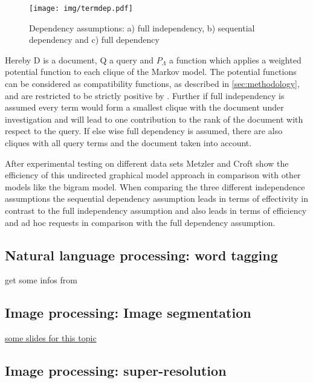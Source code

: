 \begin{figure}[htpb]
  \centering
  	\texttt{[image: img/termdep.pdf]}
  \caption{Dependency assumptions: a) full independency, b) sequential dependency and c) full dependency}
  \label{fig:termdep}
\end{figure}

Hereby D is a document, Q a query and $P_\Lambda$ a function which applies a weighted potential function to each clique of the Markov model. The potential functions can be considered as compatibility functions, as described in \ref{sec:methodology}, and are restricted to be strictly positive by \cite{metzler2005markov}. Further if full independency is assumed every term would form a smallest clique with the document under investigation and will lead to one contribution to the rank of the document with respect to the query. If else wise full dependency is assumed, there are also cliques with all query terms and the document taken into account.

After experimental testing on different data sets Metzler and Croft show the efficiency of this undirected graphical model approach in comparison with other models like the bigram model. When comparing the three different independence assumptions the sequential dependency assumption leads in terms of effectivity in contrast to the full independency assumption and also leads in terms of efficiency and ad hoc requests in comparison with the full dependency assumption.


\subsection{Natural language processing: word tagging}
\label{sec:tag}
get some infos from \cite{collobert2011natural}

\subsection{Image processing: Image segmentation}
\href{https://inf.u-szeged.hu/~ssip/2008/presentations2/Kato_ssip2008.pdf}{some slides for this topic}

\cite{kato2006markov}

\subsection{Image processing: super-resolution}
\label{sec:image}

